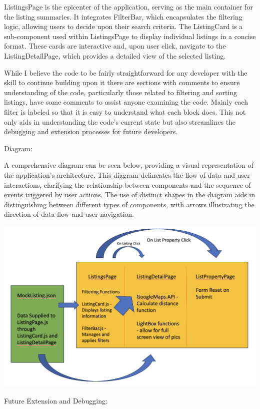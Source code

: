 \documentclass[10pt,twocolumn]{article}
\begin{document}
ListingsPage is the epicenter of the application, serving as the main container for the listing summaries. It integrates FilterBar, which encapsulates the filtering logic, allowing users to decide upon their search criteria. The ListingCard is a sub-component used within ListingsPage to display individual listings in a concise format. These cards are interactive and, upon user click, navigate to the ListingDetailPage, which provides a detailed view of the selected listing.

While I believe the code to be fairly straightforward for any developer with the skill to continue building upon it there are sections with comments to ensure understanding of the code, particularly those related to filtering and sorting listings, have some comments to assist anyone examining the code. Mainly each filter is labeled so that it is easy to understand what each block does. This not only aids in understanding the code's current state but also streamlines the debugging and extension processes for future developers.

Diagram:

A comprehensive diagram can be seen below, providing a visual representation of the application’s architecture. This diagram delineates the flow of data and user interactions, clarifying the relationship between components and the sequence of events triggered by user actions. The use of distinct shapes in the diagram aids in distinguishing between different types of components, with arrows illustrating the direction of data flow and user navigation.

\centerline{\includegraphics[scale=.35]{Code Architecture.png}}

Future Extension and Debugging:
\end{document}
